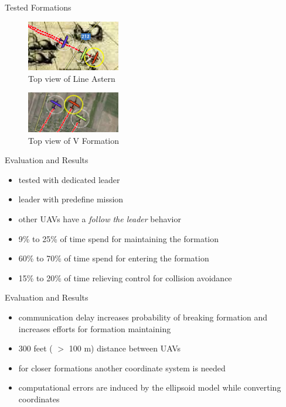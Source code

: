 \documentclass{beamer}
\begin{document}
\begin{frame}{Tested Formations}
% 
\begin{figure}[p]
\includegraphics[width=1.6in]{img/lqgc.png}
\caption{Top view of Line Astern}
\end{figure}
\begin{figure}[p]
\includegraphics[width=1.6in]{img/vqgc.png}
\caption{Top view of V Formation}
\end{figure}
\end{frame}

\begin{frame}{Evaluation and Results}
\begin{itemize}
\item tested with dedicated leader
\item leader with predefine mission
\item other UAVs have a \textit{follow the leader} behavior
\item 9\% to 25\% of time spend for maintaining the formation
\item 60\% to 70\% of time spend for entering the formation
\item 15\% to 20\% of time relieving control for collision avoidance
\end{itemize}
\end{frame}

\begin{frame}{Evaluation and Results}
\begin{itemize}
\item communication delay increases probability of breaking formation and increases efforts for formation maintaining
\item 300 feet ( $>$ 100 m) distance between UAVs
\item for closer formations another coordinate system is needed
\item computational errors are induced by the ellipsoid model while converting coordinates
\end{itemize}
\end{frame}
\end{document}
